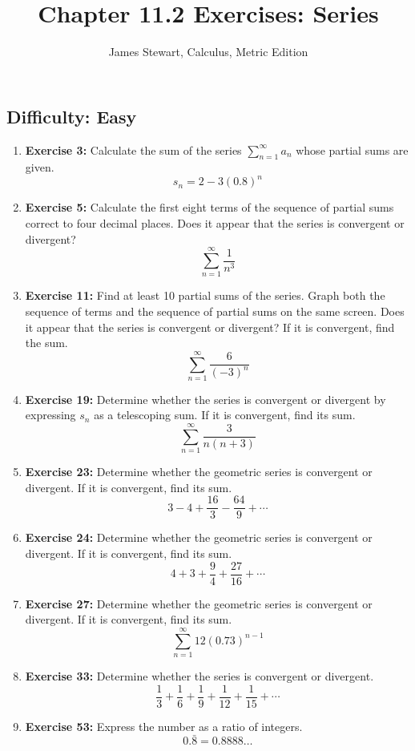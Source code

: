\documentclass[12pt, a4paper]{article}
\title{Chapter 11.2 Exercises: Series}
\author{James Stewart, Calculus, Metric Edition}
\date{}
\begin{document}
\maketitle
\hrulefill
\vspace{1em}

\subsection*{Difficulty: Easy}
\begin{enumerate}
    \item \textbf{Exercise 3:} Calculate the sum of the series $\sum_{n=1}^{\infty} a_n$ whose partial sums are given.
    \[ s_n = 2 - 3(0.8)^n \]

    \item \textbf{Exercise 5:} Calculate the first eight terms of the sequence of partial sums correct to four decimal places. Does it appear that the series is convergent or divergent?
    \[ \sum_{n=1}^{\infty} \frac{1}{n^3} \]

    \item \textbf{Exercise 11:} Find at least 10 partial sums of the series. Graph both the sequence of terms and the sequence of partial sums on the same screen. Does it appear that the series is convergent or divergent? If it is convergent, find the sum.
    \[ \sum_{n=1}^{\infty} \frac{6}{(-3)^n} \]

    \item \textbf{Exercise 19:} Determine whether the series is convergent or divergent by expressing $s_n$ as a telescoping sum. If it is convergent, find its sum.
    \[ \sum_{n=1}^{\infty} \frac{3}{n(n+3)} \]

    \item \textbf{Exercise 23:} Determine whether the geometric series is convergent or divergent. If it is convergent, find its sum.
    \[ 3 - 4 + \frac{16}{3} - \frac{64}{9} + \cdots \]

    \item \textbf{Exercise 24:} Determine whether the geometric series is convergent or divergent. If it is convergent, find its sum.
    \[ 4 + 3 + \frac{9}{4} + \frac{27}{16} + \cdots \]

    \item \textbf{Exercise 27:} Determine whether the geometric series is convergent or divergent. If it is convergent, find its sum.
    \[ \sum_{n=1}^{\infty} 12(0.73)^{n-1} \]

    \item \textbf{Exercise 33:} Determine whether the series is convergent or divergent.
    \[ \frac{1}{3} + \frac{1}{6} + \frac{1}{9} + \frac{1}{12} + \frac{1}{15} + \cdots \]

    \item \textbf{Exercise 53:} Express the number as a ratio of integers.
    \[ 0.\bar{8} = 0.8888\dots \]
\end{enumerate}
\end{document}
